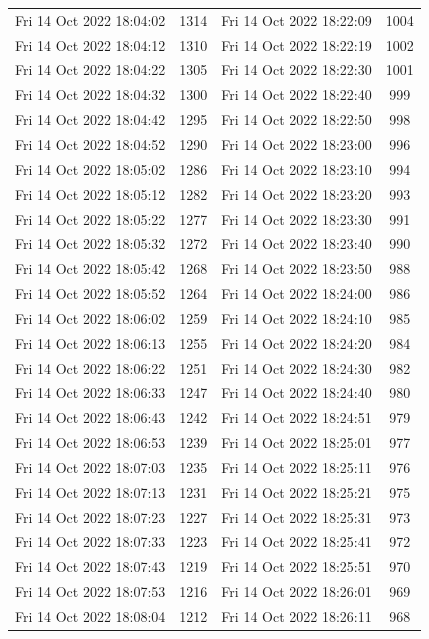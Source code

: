 \documentclass[12pt]{ctexart}
\numberwithin{equation}{section}
\begin{document}
\begin{longtable}{cc|cc}
Fri 14 Oct 2022 18:04:02 & 1314 & Fri 14 Oct 2022 18:22:09 & 1004 \\
Fri 14 Oct 2022 18:04:12 & 1310 & Fri 14 Oct 2022 18:22:19 & 1002 \\
Fri 14 Oct 2022 18:04:22 & 1305 & Fri 14 Oct 2022 18:22:30 & 1001 \\
Fri 14 Oct 2022 18:04:32 & 1300 & Fri 14 Oct 2022 18:22:40 & 999 \\
Fri 14 Oct 2022 18:04:42 & 1295 & Fri 14 Oct 2022 18:22:50 & 998 \\
Fri 14 Oct 2022 18:04:52 & 1290 & Fri 14 Oct 2022 18:23:00 & 996 \\
Fri 14 Oct 2022 18:05:02 & 1286 & Fri 14 Oct 2022 18:23:10 & 994 \\
Fri 14 Oct 2022 18:05:12 & 1282 & Fri 14 Oct 2022 18:23:20 & 993 \\
Fri 14 Oct 2022 18:05:22 & 1277 & Fri 14 Oct 2022 18:23:30 & 991 \\
Fri 14 Oct 2022 18:05:32 & 1272 & Fri 14 Oct 2022 18:23:40 & 990 \\
Fri 14 Oct 2022 18:05:42 & 1268 & Fri 14 Oct 2022 18:23:50 & 988 \\
Fri 14 Oct 2022 18:05:52 & 1264 & Fri 14 Oct 2022 18:24:00 & 986 \\
Fri 14 Oct 2022 18:06:02 & 1259 & Fri 14 Oct 2022 18:24:10 & 985 \\
Fri 14 Oct 2022 18:06:13 & 1255 & Fri 14 Oct 2022 18:24:20 & 984 \\
Fri 14 Oct 2022 18:06:22 & 1251 & Fri 14 Oct 2022 18:24:30 & 982 \\
Fri 14 Oct 2022 18:06:33 & 1247 & Fri 14 Oct 2022 18:24:40 & 980 \\
Fri 14 Oct 2022 18:06:43 & 1242 & Fri 14 Oct 2022 18:24:51 & 979 \\
Fri 14 Oct 2022 18:06:53 & 1239 & Fri 14 Oct 2022 18:25:01 & 977 \\
Fri 14 Oct 2022 18:07:03 & 1235 & Fri 14 Oct 2022 18:25:11 & 976 \\
Fri 14 Oct 2022 18:07:13 & 1231 & Fri 14 Oct 2022 18:25:21 & 975 \\
Fri 14 Oct 2022 18:07:23 & 1227 & Fri 14 Oct 2022 18:25:31 & 973 \\
Fri 14 Oct 2022 18:07:33 & 1223 & Fri 14 Oct 2022 18:25:41 & 972 \\
Fri 14 Oct 2022 18:07:43 & 1219 & Fri 14 Oct 2022 18:25:51 & 970 \\
Fri 14 Oct 2022 18:07:53 & 1216 & Fri 14 Oct 2022 18:26:01 & 969 \\
Fri 14 Oct 2022 18:08:04 & 1212 & Fri 14 Oct 2022 18:26:11 & 968 \\

\end{longtable}
\end{document}
